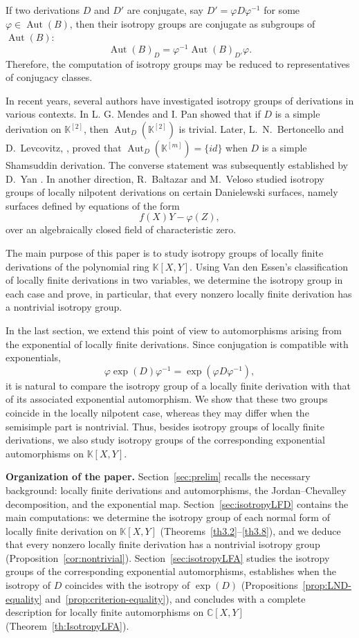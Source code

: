 \documentclass[11pt,a4paper,reqno]{amsart}
\begin{document}
If two derivations $D$ and $D'$ are conjugate, say $D'=\varphi D\varphi^{-1}$ for some $\varphi\in \operatorname{Aut}(B)$, then their isotropy groups are conjugate as subgroups of $\operatorname{Aut}(B)$:
\[
\operatorname{Aut}(B)_D=\varphi^{-1}\operatorname{Aut}(B)_{D'}\varphi.
\]
Therefore, the computation of isotropy groups may be reduced to representatives of conjugacy classes.

In recent years, several authors have investigated isotropy groups of derivations in various contexts. In \cite{mendes17plane} L. G. Mendes and I. Pan showed that if $D$ is a simple derivation on $\mathbb{K}^{[2]}$, then $\operatorname{Aut}_D(\mathbb{K}^{[2]})$ is trivial. Later,  L.~N.~Bertoncello and D.~Levcovitz, \cite{bertoncello2020isotropy}, proved that $\operatorname{Aut}_D(\mathbb{K}^{[m]})=\{id\}$ when $D$ is a simple Shamsuddin derivation. The converse statement was subsequently established by D.~Yan \cite{yan2024shamsuddin}. In another direction, R.~Baltazar and M.~Veloso \cite{BalVel21} studied isotropy groups of locally nilpotent derivations on certain Danielewski surfaces, namely surfaces defined by equations of the form
\[
f(X)Y-\varphi(Z),
\]
over an algebraically closed field of characteristic zero.

The main purpose of this paper is to study isotropy groups of locally finite derivations of the polynomial ring $\mathbb{K}[X,Y]$. Using Van den Essen's classification of locally finite derivations in two variables, we determine the isotropy group in each case and prove, in particular, that every nonzero locally finite derivation has a nontrivial isotropy group.

In the last section, we extend this point of view to automorphisms arising from the exponential of locally finite derivations. Since conjugation is compatible with exponentials,
\[
\varphi\exp(D)\varphi^{-1}=\exp(\varphi D\varphi^{-1}),
\]
it is natural to compare the isotropy group of a locally finite derivation with that of its associated exponential automorphism. We show that these two groups coincide in the locally nilpotent case, whereas they may differ when the semisimple part is nontrivial. Thus, besides isotropy groups of locally finite derivations, we also study isotropy groups of the corresponding exponential automorphisms on $\mathbb{K}[X,Y]$.

\smallskip
\noindent\textbf{Organization of the paper.}
Section~\ref{sec:prelim} recalls the necessary background: locally finite derivations and automorphisms, the Jordan--Chevalley decomposition, and the exponential map. Section~\ref{sec:isotropyLFD} contains the main computations: we determine the isotropy group of each normal form of locally finite derivation on $\mathbb{K}[X,Y]$ (Theorems~\ref{th3.2}--\ref{th3.8}), and we deduce that every nonzero locally finite derivation has a nontrivial isotropy group (Proposition~\ref{cor:nontrivial}). Section~\ref{sec:isotropyLFA} studies the isotropy groups of the corresponding exponential automorphisms, establishes when the isotropy of $D$ coincides with the isotropy of $\exp(D)$ (Propositions~\ref{prop:LND-equality} and~\ref{prop:criterion-equality}), and concludes with a complete description for locally finite automorphisms on $\mathbb{C}[X,Y]$ (Theorem~\ref{th:IsotropyLFA}).
\end{document}
